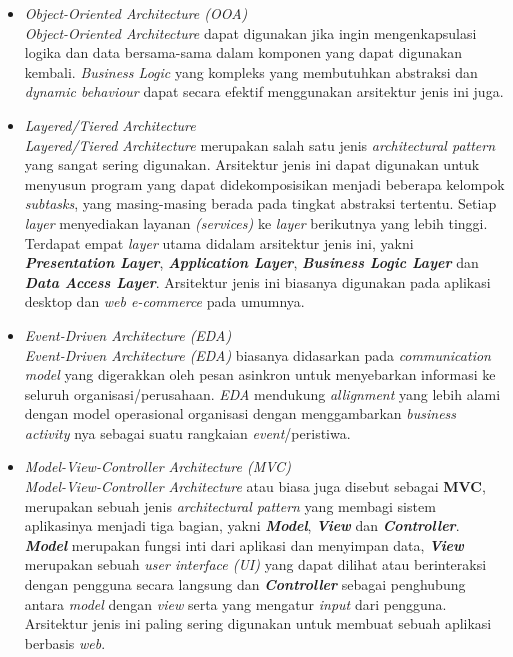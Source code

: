 \documentclass[a4paper]{article}
\begin{document}
\begin{itemize}
    \item \textit{Object-Oriented Architecture (OOA)}\\
          \textit{Object-Oriented Architecture} dapat digunakan jika ingin mengenkapsulasi logika dan data bersama-sama dalam komponen yang dapat digunakan kembali. \textit{Business Logic} yang kompleks yang membutuhkan abstraksi dan \textit{dynamic behaviour} dapat secara efektif menggunakan arsitektur jenis ini juga.
    \item \textit{Layered/Tiered Architecture}\\
          \textit{Layered/Tiered Architecture} merupakan salah satu jenis \textit{architectural pattern} yang sangat sering digunakan\autocite*{architectural-pattern}. Arsitektur jenis ini dapat digunakan untuk menyusun program yang dapat didekomposisikan menjadi beberapa kelompok \textit{subtasks}, yang masing-masing berada pada tingkat abstraksi tertentu. Setiap \textit{layer} menyediakan layanan \textit{(services)} ke \textit{layer} berikutnya yang lebih tinggi. Terdapat empat \textit{layer} utama didalam arsitektur jenis ini, yakni \textbf{\textit{Presentation Layer}}, \textbf{\textit{Application Layer}}, \textbf{\textit{Business Logic Layer}} dan \textbf{\textit{Data Access Layer}}. Arsitektur jenis ini biasanya digunakan pada aplikasi desktop dan \textit{web e-commerce} pada umumnya\autocite*{archi-pattern}.
    \item \textit{Event-Driven Architecture (EDA)}\\
          \textit{Event-Driven Architecture (EDA)} biasanya didasarkan pada \textit{communication model} yang digerakkan oleh pesan asinkron untuk menyebarkan informasi ke seluruh organisasi/perusahaan. \textit{EDA} mendukung \textit{allignment} yang lebih alami dengan model operasional organisasi dengan menggambarkan \textit{business activity} nya sebagai suatu rangkaian \textit{event}/peristiwa\autocite*{architectural-pattern}.
    \item \textit{Model-View-Controller Architecture (MVC)}\\
          \textit{Model-View-Controller Architecture} atau biasa juga disebut sebagai \textbf{MVC}, merupakan sebuah jenis \textit{architectural pattern} yang membagi sistem aplikasinya menjadi tiga bagian, yakni \textbf{\textit{Model}}, \textbf{\textit{View}} dan \textbf{\textit{Controller}}. \textbf{\textit{Model}} merupakan fungsi inti dari aplikasi dan menyimpan data, \textbf{\textit{View}} merupakan sebuah \textit{user interface (UI)} yang dapat dilihat atau berinteraksi dengan pengguna secara langsung dan \textbf{\textit{Controller}} sebagai penghubung antara \textit{model} dengan \textit{view} serta yang mengatur \textit{input} dari pengguna. Arsitektur jenis ini paling sering digunakan untuk membuat sebuah aplikasi berbasis \textit{web}\autocite*{archi-pattern}.
\end{itemize}
\end{document}
